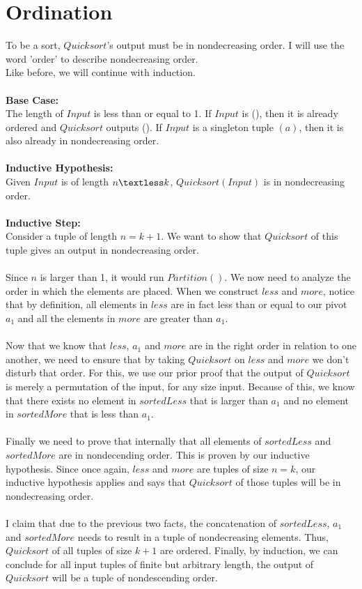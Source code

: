 \documentclass{article}
\begin{document}
\section{Ordination}
To be a sort, $Quicksort$'s output must be in nondecreasing order. I will use the word 'order' to describe nondecreasing order. \\
Like before, we will continue with induction.\\\\
\textbf{Base Case:}\\
The length of $Input$ is less than or equal to 1. If $Input$ is (), then it is already ordered and $Quicksort$ outputs (). If $Input$ is a singleton tuple $(a)$, then it is also already in nondecreasing order. 
\\\\
\textbf{Inductive Hypothesis:}\\
Given $Input$ is of length $n \textless k$, $Quicksort(Input)$ is in nondecreasing order.
\\\\
\textbf{Inductive Step:}\\
Consider a tuple of length $n=k+1$. We want to show that $Quicksort$ of this tuple gives an output in nondecreasing order. \\\\
Since $n$ is larger than 1, it would run $Partition()$.
We now need to analyze the order in which the elements are placed. When we construct $less$ and $more$, notice that by definition, all elements in $less$ are in fact less than or equal to our pivot $a_{1}$ and all the elements in $more$ are greater than $a_{1}$.
\\\\
Now that we know that $less$, $a_{1}$ and $more$ are in the right order in relation to one another, we need to ensure that by taking $Quicksort$ on $less$ and $more$ we don't disturb that order. For this, we use our prior proof that the output of $Quicksort$ is merely a permutation of the input, for any size input. Because of this, we know that there exists no element in $sortedLess$ that is larger than $a_{1}$ and no element in $sortedMore$ that is less than $a_{1}$.
\\\\
Finally we need to prove that internally that all elements of $sortedLess$ and $sortedMore$ are in nondecending order. This is proven by our inductive hypothesis. Since once again, $less$ and $more$ are tuples of size $n=k$, our inductive hypothesis applies and says that $Quicksort$ of those tuples will be in nondecreasing order.
\\\\
I claim that due to the previous two facts, the concatenation of $sortedLess$, $a_{1}$ and $sortedMore$ needs to result in a tuple of nondecreasing elements. Thus, $Quicksort$ of all tuples of size $k+1$ are ordered. Finally, by induction, we can conclude for all input tuples of finite but arbitrary length, the output of $Quicksort$ will be a tuple of nondescending order.
\pagebreak
\end{document}

